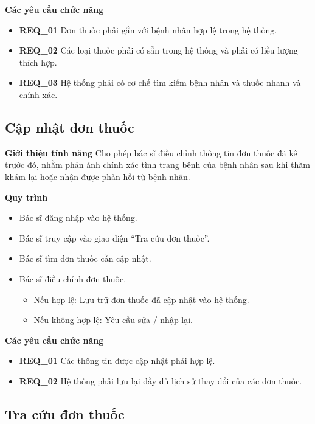 \noindent \textbf{Các yêu cầu chức năng}
\begin{itemize}
    \item \textbf{REQ\_01} Đơn thuốc phải gắn với bệnh nhân hợp lệ trong hệ thống.
    \item \textbf{REQ\_02} Các loại thuốc phải có sẵn trong hệ thống và phải có liều lượng thích hợp.
    \item \textbf{REQ\_03} Hệ thống phải có cơ chế tìm kiếm bệnh nhân và thuốc nhanh và chính xác.
\end{itemize}

\subsection{Cập nhật đơn thuốc}

\noindent \textbf{Giới thiệu tính năng}
Cho phép bác sĩ điều chỉnh thông tin đơn thuốc đã kê trước đó, nhằm phản ánh chính xác tình trạng bệnh của bệnh nhân sau khi thăm khám lại hoặc nhận được phản hồi từ bệnh nhân.

\noindent \textbf{Quy trình}
\begin{itemize}
    \item Bác sĩ đăng nhập vào hệ thống.
    \item Bác sĩ truy cập vào giao diện ``Tra cứu đơn thuốc''.
    \item Bác sĩ tìm đơn thuốc cần cập nhật.
    \item Bác sĩ điều chỉnh đơn thuốc.
    \begin{itemize}
        \item Nếu hợp lệ: Lưu trữ đơn thuốc đã cập nhật vào hệ thống.
        \item Nếu không hợp lệ: Yêu cầu sửa / nhập lại.
    \end{itemize}
\end{itemize}

\noindent \textbf{Các yêu cầu chức năng} 
\begin{itemize}
    \item \textbf{REQ\_01} Các thông tin được cập nhật phải hợp lệ.
    \item \textbf{REQ\_02} Hệ thống phải lưu lại đầy đủ lịch sử thay đổi của các đơn thuốc.
\end{itemize}

\subsection{Tra cứu đơn thuốc}

